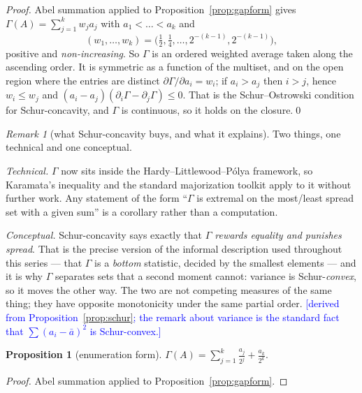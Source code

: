 \documentclass[11pt,a4paper]{article}
\theoremstyle{plain}
\newtheorem{proposition}[theorem]{Proposition}
\theoremstyle{definition}
\theoremstyle{remark}
\newtheorem{remark}[theorem]{Remark}
\newcommand{\STATUS}[1]{\textcolor{blue}{\textsf{[#1]}}}
\begin{document}
\begin{proof}
Abel summation applied to Proposition~\ref{prop:gapform} gives
$\Gamma(A)=\sum_{j=1}^{k}w_ja_j$ with $a_1<\dots<a_k$ and
\[
  (w_1,\dots,w_k)=\bigl(\tfrac12,\tfrac14,\dots,2^{-(k-1)},2^{-(k-1)}\bigr),
\]
positive and \emph{non-increasing}. So $\Gamma$ is an ordered weighted average taken along the
ascending order. It is symmetric as a function of the multiset, and on the open region where
the entries are distinct $\partial\Gamma/\partial a_i=w_i$; if $a_i>a_j$ then $i>j$, hence
$w_i\le w_j$ and $(a_i-a_j)(\partial_i\Gamma-\partial_j\Gamma)\le0$. That is the
Schur--Ostrowski condition for Schur-concavity, and $\Gamma$ is continuous, so it holds on the
closure.\qed
\end{proof}

\begin{remark}[what Schur-concavity buys, and what it explains]\label{rem:schur}
Two things, one technical and one conceptual.

\emph{Technical.} $\Gamma$ now sits inside the Hardy--Littlewood--P\'olya framework, so
Karamata's inequality and the standard majorization toolkit apply to it without further work.
Any statement of the form ``$\Gamma$ is extremal on the most/least spread set with a given sum''
is a corollary rather than a computation.

\emph{Conceptual.} Schur-concavity says exactly that \emph{$\Gamma$ rewards equality and
punishes spread}. That is the precise version of the informal description used throughout this
series --- that $\Gamma$ is a \emph{bottom} statistic, decided by the smallest elements --- and
it is why $\Gamma$ separates sets that a second moment cannot: variance is Schur-\emph{convex},
so it moves the other way. The two are not competing measures of the same thing; they have
opposite monotonicity under the same partial order.
\STATUS{derived from Proposition~\ref{prop:schur}; the remark about variance is the standard
fact that $\sum(a_i-\bar a)^2$ is Schur-convex.}
\end{remark}

\begin{proposition}[enumeration form]\label{prop:enumform}
$\displaystyle\Gamma(A)=\sum_{j=1}^{k}\frac{a_j}{2^{j}}+\frac{a_k}{2^{k}}.$
\end{proposition}

\begin{proof}
Abel summation applied to Proposition~\ref{prop:gapform}.
\end{proof}
\end{document}
